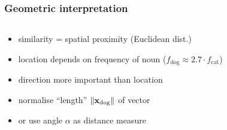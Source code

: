 \begin{frame}
  \frametitle{Geometric interpretation}

  \begin{columns}[T]
    \begin{column}{40mm}
      \begin{itemize}
      \item similarity = spatial proximity (Euclidean dist.)
      \item location depends on frequency of noun ($f_{\text{dog}} \approx 2.7\cdot f_{\text{cat}}$)
      \item direction more important than location
      \item<1-> normalise ``length'' $\norm{\vx_{\text{dog}}}$ of vector
      \item<2-> or use angle $\alpha$ as distance measure
      \end{itemize}
    \end{column}
    \begin{column}{75mm}
      \ungap[1]
    \end{column}
  \end{columns}
\end{frame}

